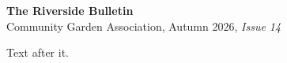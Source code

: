 \documentclass{article}
\begin{document}
\noindent\parbox{\textwidth}{\centering
{\Huge\bfseries The Riverside Bulletin}\\[2pt]
{\small Community Garden Association, Autumn 2026, {\itshape Issue 14}}}

Text after it.
\end{document}
